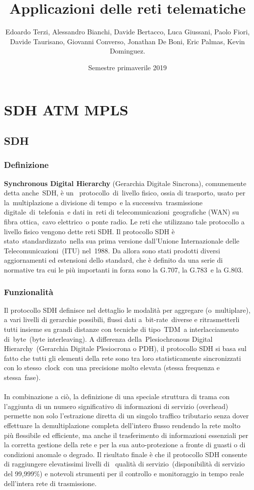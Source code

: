 \documentclass{article}
\title{\Huge Applicazioni delle reti telematiche \vspace{1cm}}
\author{Edoardo Terzi, Alessandro Bianchi, Davide Bertacco, Luca Giussani, Paolo Fiori, \\
Davide Taurisano, Giovanni Converso, Jonathan De Boni, Eric Palmas, Kevin Dominguez.\vspace{0.5cm}}
\date{Semestre primaverile 2019}
\begin{document}
\maketitle
\thispagestyle{empty}
\pagebreak

\tableofcontents
\lstset{language=C++}
\pagebreak

\section{SDH ATM MPLS}
\subsection{SDH}
\subsubsection{Definizione}
\noindent
\textbf{Synchronous Digital Hierarchy} (Gerarchia Digitale Sincrona), comunemente detta anche SDH, è un 
protocollo di livello fisico, ossia di trasporto, usato per la multiplazione a divisione di tempo e la 
successiva trasmissione digitale di telefonia e dati in reti di telecomunicazioni geografiche (WAN) su 
fibra ottica, cavo elettrico o ponte radio. Le reti che utilizzano tale protocollo a livello fisico 
vengono dette reti SDH. Il protocollo SDH è stato standardizzato nella sua prima versione dall'Unione 
Internazionale delle Telecomunicazioni (ITU) nel 1988. Da allora sono stati prodotti diversi aggiornamenti 
ed estensioni dello standard, che è definito da una serie di normative tra cui le più importanti in forza 
sono la G.707, la G.783 e la G.803.
\subsubsection{Funzionalità}
\noindent
Il protocollo SDH definisce nel dettaglio le modalità per aggregare (o multiplare), a vari livelli di 
gerarchie possibili, flussi dati a bit-rate diverse e ritrasmetterli tutti insieme su grandi distanze 
con tecniche di tipo TDM a interlacciamento di byte (byte interleaving). A differenza della Plesiochronous 
Digital Hierarchy (Gerarchia Digitale Plesiocrona o PDH), il protocollo SDH si basa sul fatto che tutti 
gli elementi della rete sono tra loro statisticamente sincronizzati con lo stesso clock con una precisione 
molto elevata (stessa frequenza e stessa fase).\\\\
In combinazione a ciò, la definizione di una speciale struttura di trama con l'aggiunta di un numero 
significativo di informazioni di servizio (overhead) permette non solo l'estrazione diretta di un singolo 
traffico tributario senza dover effettuare la demultiplazione completa dell'intero flusso rendendo la 
rete molto più flessibile ed efficiente, ma anche il trasferimento di informazioni essenziali per la 
corretta gestione della rete e per la sua auto-protezione a fronte di guasti o di condizioni anomale o 
degrado. Il risultato finale è che il protocollo SDH consente di raggiungere elevatissimi livelli di 
qualità di servizio (disponibilità di servizio del 99,999\%) e notevoli strumenti per il controllo e 
monitoraggio in tempo reale dell'intera rete di trasmissione.
\end{document}
